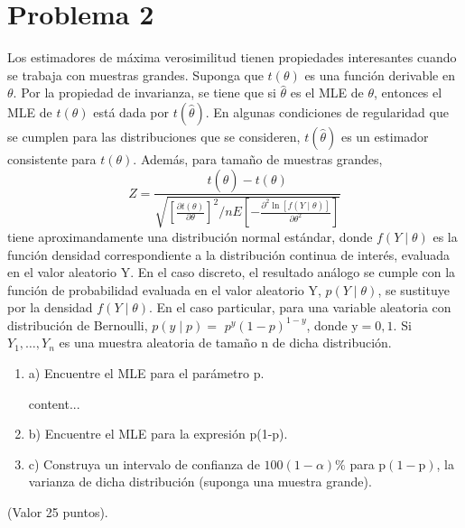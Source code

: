 \section{Problema 2}


Los estimadores de máxima verosimilitud tienen propiedades interesantes cuando se trabaja con muestras grandes. Suponga que $t(\theta)$ es una función derivable en $\theta$. Por la propiedad de invarianza, se tiene que si $\hat{\theta}$ es el MLE de $\theta$, entonces el MLE de $t(\theta)$ está dada por $t(\hat{\theta}) .$ En algunas condiciones de regularidad que se cumplen para las distribuciones que se consideren, $t(\hat{\theta})$ es un estimador consistente para $t(\theta) .$ Además, para tamaño de muestras grandes,
$$
Z=\frac{t(\hat{\theta})-t(\theta)}{\sqrt{\left[\frac{\partial t(\theta)}{\partial \theta}\right]^{2} \Big/ n E\left[-\frac{\partial^{2} \ln [f(Y \mid \theta)]}{\partial \theta^{2}}\right]}}
$$
tiene aproximandamente una distribución normal estándar, donde $f(Y \mid \theta)$ es la función densidad correspondiente a la distribución continua de interés, evaluada en el valor aleatorio Y. En el caso discreto, el resultado análogo se cumple con la función de probabilidad evaluada en el valor aleatorio $\mathrm{Y}$, $p(Y \mid \theta)$, se sustituye por la densidad $f(Y \mid \theta)$. En el caso particular, para una variable aleatoria con distribución de Bernoulli, $p(y \mid p)=$ $p^{y}(1-p)^{1-y}$, donde $\mathrm{y}=0,1 .$ Si $Y_{1}, \ldots, Y_{n}$ es una muestra aleatoria de tamaño $\mathrm{n}$ de dicha distribución.

\begin{enumerate}
	\item a) Encuentre el MLE para el parámetro p.
	\begin{solution}
		content...
	\end{solution}
	\item b) Encuentre el MLE para la expresión p(1-p).
	\item c) Construya un intervalo de confianza de $100(1-\alpha) \%$ para $\mathrm{p}(1-\mathrm{p})$, la varianza de dicha distribución (suponga una muestra grande).
\end{enumerate}
 (Valor 25 puntos).
